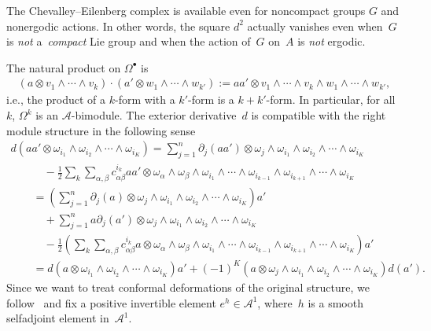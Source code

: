 \documentclass[pdftex]{sigma}
\newcommand{\Aa}{\mathcal{A}}
\numberwithin{equation}{section}
\begin{document}
\begin{Remark}
The Chevalley--Eilenberg complex is available even for noncompact groups $G$ and nonergodic actions. In other words, the square $d^2$ actually vanishes even when~$G$ is \emph{not} a~\emph{compact} Lie group and when the action of~$G$ on~$A$ is \emph{not} ergodic.
\end{Remark}

The natural product on $\Omega^\bullet$ is
\begin{gather}
\label{Eqn:ProdOmega}
(a \otimes v_1 \wedge \cdots \wedge v_k) \cdot (a' \otimes w_{1} \wedge \cdots \wedge w_{k'}) := a a' \otimes v_1 \wedge \cdots \wedge v_k \wedge w_1 \wedge \cdots \wedge w_{k'},
\end{gather}
i.e., the product of a $k$-form with a $k'$-form is a $k+k'$-form. In particular, for all~$k$, $\Omega^k$ is an $\Aa$-bimodule. The exterior derivative~$d$ is compatible with the right module structure in the following sense
\begin{gather*}
d( a a'\otimes \omega_{i_1} \wedge \omega_{i_2} \wedge \cdots \wedge \omega_{i_K} ) =\sum_{j = 1}^n \partial _j(a a') \otimes \omega_j \wedge \omega_{i_1} \wedge \omega_{i_2} \wedge \cdots \wedge \omega_{i_K} \\
\qquad\quad{}
 - \frac{1}{2} \sum_{k} \sum_{\alpha, \beta} c^{i_k}_{\alpha \beta} a a'\otimes \omega_\alpha \wedge \omega_\beta \wedge \omega_{i_1} \wedge \cdots \wedge \omega_{i_{k-1}} \wedge \omega_{i_{k+1}} \wedge \cdots \wedge \omega_{i_K}
\\
\qquad{}= \left( \sum_{j = 1}^n \partial _j(a) \otimes \omega_j \wedge \omega_{i_1} \wedge \omega_{i_2} \wedge \cdots \wedge \omega_{i_K} \right) a' \\
\qquad\quad{}
+\sum_{j = 1}^n a\partial _j(a') \otimes \omega_j \wedge \omega_{i_1} \wedge \omega_{i_2} \wedge \cdots \wedge \omega_{i_K} \\
\qquad\quad{}
 - \frac{1}{2} \left( \sum_{k} \sum_{\alpha, \beta} c^{i_k}_{\alpha \beta} a \otimes \omega_\alpha \wedge \omega_\beta \wedge \omega_{i_1} \wedge \cdots \wedge \omega_{i_{k-1}} \wedge \omega_{i_{k+1}} \wedge \cdots \wedge \omega_{i_K} \right) a'
\\
\qquad{}
= d( a \otimes \omega_{i_1} \wedge \omega_{i_2} \wedge \cdots \wedge \omega_{i_K} ) a'
+(-1)^K (a \otimes \omega_j \wedge \omega_{i_1} \wedge \omega_{i_2} \wedge \cdots \wedge \omega_{i_K}) d(a').
\end{gather*}
Since we want to treat conformal deformations of the original structure, we follow~\cite{GaussBonnet-ConnesTretkoff} and f\/ix a positive invertible element $e^{h} \in \Aa^1$, where~$h$ is a smooth selfadjoint element in~$\Aa^1$.
\end{document}
